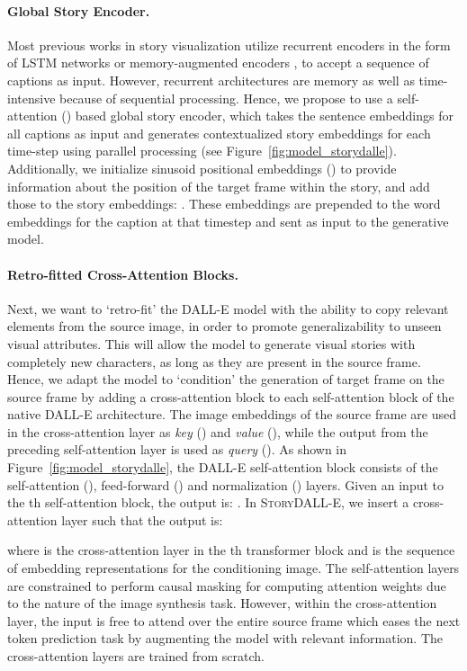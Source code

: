 \documentclass[runningheads]{llncs}
\newcommand{\sdalle}[1]{\textsc{StoryDALL-E}}
\begin{document}
\paragraph{Global Story Encoder.}
Most previous works in story visualization utilize recurrent encoders in the form of LSTM networks \cite{li2019storygan} or memory-augmented encoders \cite{maharana2021improving, maharana2021integrating}, to accept a sequence of captions as input. However, recurrent architectures are memory as well as time-intensive because of sequential processing. Hence, we propose to use a self-attention () based global story encoder, which takes the sentence embeddings for all captions as input and generates contextualized story embeddings for each time-step using parallel processing (see Figure~\ref{fig:model_storydalle}). Additionally, we initialize sinusoid positional embeddings () to provide information about the position of the target frame within the story, and add those to the story embeddings: . These embeddings are prepended to the word embeddings for the caption at that timestep and sent as input to the generative model.

\paragraph{Retro-fitted Cross-Attention Blocks.}

Next, we want to `retro-fit' the DALL-E model with the ability to copy relevant elements from the source image, in order to promote generalizability to unseen visual attributes. This will allow the model to generate visual stories with completely new characters, as long as they are present in the source frame. Hence, we adapt the model to `condition' the generation of target frame on the source frame by adding a cross-attention block to each self-attention block of the native DALL-E architecture. The image embeddings of the source frame are used in the cross-attention layer as \textit{key} () and \textit{value} (), while the output from the preceding self-attention layer is used as \textit{query} (). As shown in Figure~\ref{fig:model_storydalle}, the DALL-E self-attention block consists of the self-attention (), feed-forward () and normalization () layers. Given an input  to the th self-attention block, the output  is: . In \sdalle{}, we insert a cross-attention layer such that the output  is:

where  is the cross-attention layer in the th transformer block and  is the sequence of embedding representations for the conditioning image. The self-attention layers are constrained to perform causal masking for computing attention weights due to the nature of the image synthesis task. However, within the cross-attention layer, the input is free to attend over the entire source frame which eases the next token prediction task by augmenting the model with relevant information. The cross-attention layers are trained from scratch.\\
\end{document}
